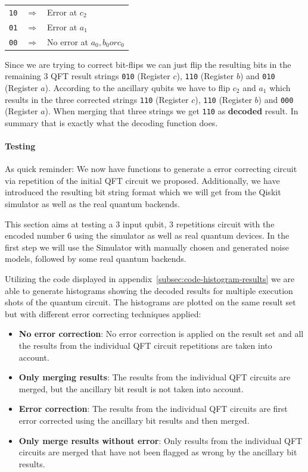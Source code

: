 \begin{center}
    \begin{tabular}{ r c l }
        \texttt{10} & \(\Rightarrow\) & Error at \(c_2\) \\
        \texttt{01} & \(\Rightarrow\) & Error at \(a_1\) \\
        \texttt{00} & \(\Rightarrow\) & No error at \(a_0, b_0 or c_0\) \\
    \end{tabular}
\end{center}

Since we are trying to correct bit-flips we can just flip the resulting bits in the remaining 3 QFT result strings \texttt{010} (Register \(c\)), \texttt{110} (Register \(b\)) and \texttt{010} (Register \(a\)).
According to the ancillary qubits we have to flip \(c_2\) and \(a_1\) which results in the three corrected strings \texttt{110} (Register \(c\)), \texttt{110} (Register \(b\)) and \texttt{000} (Register \(a\)).
When merging that three strings we get \texttt{110} as \textbf{decoded} result.
In summary that is exactly what the decoding function does.

\paragraph{Testing}

As quick reminder: We now have functions to generate a error correcting circuit via repetition of the initial QFT circuit we proposed.
Additionally, we have introduced the resulting bit string format which we will get from the Qiskit simulator as well as the real quantum backends.

This section aims at testing a 3 input qubit, 3 repetitions circuit with the encoded number 6 using the simulator as well as real quantum devices.
In the first step we will use the Simulator with manually chosen and generated noise models, followed by some real quantum backends.

Utilizing the code displayed in appendix~\ref{subsec:code-histogram-results} we are able to generate histograms showing the decoded results for multiple execution shots of the quantum circuit.
The histograms are plotted on the same result set but with different error correcting techniques applied:
\begin{itemize}
    \item \textbf{No error correction}: No error correction is applied on the result set and all the results from the individual QFT circuit repetitions are taken into account.
    \item \textbf{Only merging results}: The results from the individual QFT circuits are merged, but the ancillary bit result is not taken into account.
    \item \textbf{Error correction}: The results from the individual QFT circuits are first error corrected using the ancillary bit results and then merged.
    \item \textbf{Only merge results without error}: Only results from the individual QFT circuits are merged that have not been flagged as wrong by the ancillary bit results.
\end{itemize}


